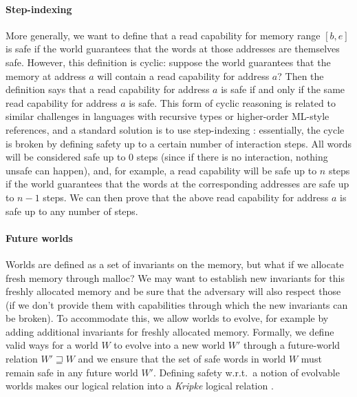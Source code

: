 \documentclass[format=acmsmall, review=true, screen=true]{acmart}
\newcommand{\future}{\mathbin{\sqsupseteq}}
\newenvironment{toplas}%
    {\color{OliveGreen}}{}
\begin{document}
\begin{toplas}
\paragraph{Step-indexing}
More generally, we want to define that a read capability for memory range
$[b,e]$ is safe if the world guarantees that the words at those addresses are
themselves safe. However, this definition is cyclic: suppose the world
guarantees that the memory at address $a$ will contain a read capability for
address $a$? Then the definition says that a read capability for address
$a$ is safe if and only if the same read capability for address $a$ is safe. This form of
cyclic reasoning is related to similar challenges in languages with recursive
types or higher-order ML-style references, and a standard solution is
to use step-indexing \citep{Appel:2001:IMR:504709.504712}: essentially, the cycle is broken by defining safety up to a
certain number of interaction steps. All words will be considered
safe up to $0$ steps (since if there is no interaction, nothing unsafe
can happen), and, for example, a read capability will be safe up to $n$
steps if the world guarantees that the words at the corresponding addresses are
safe up to $n - 1$ steps. We can then prove that the above read capability for
address $a$ is safe up to any number of steps.

\paragraph{Future worlds}
Worlds are defined as a set of invariants on the memory, but what if we
allocate fresh memory through malloc? We may want to establish new invariants
for this freshly allocated memory and be sure that the adversary will also
respect those (if we don't provide them with capabilities through which the new
invariants can be broken). To accommodate this, we allow worlds to evolve, for
example by adding additional invariants for freshly allocated memory. Formally,
we define valid ways for a world $W$ to evolve into a new world $W'$ through a
future-world relation $W' \future W$ and we ensure that the set of safe words in
world $W$ must remain safe in any future world $W'$. Defining safety w.r.t.\ a
notion of evolvable worlds makes our logical relation into a \emph{Kripke}
logical relation \citep{pitts_operational_1998}.


\end{toplas}
\end{document}
